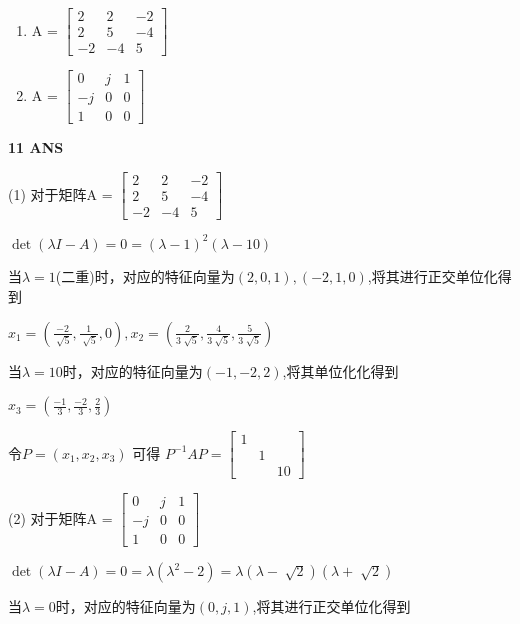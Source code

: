 \documentclass[11pt,letterpaper]{ctexart}
\begin{document}
\begin{enumerate}
\begin{enumerate}
	\item A = $\begin{bmatrix}
		2 & 2 & -2 \\
		2 & 5 & -4 \\
		-2 & -4 & 5  
		\end{bmatrix}$
	
	\item A = $\begin{bmatrix}
		0 & j & 1 \\
	-j & 0 & 0 \\
	1 & 0 & 0
	\end{bmatrix}$

\end{enumerate}




\textbf{11 ANS}
\bigskip

(1) 对于矩阵A = $\begin{bmatrix}
2 & 2 & -2 \\
2 & 5 & -4 \\
-2 & -4 & 5  
\end{bmatrix}$

$\det(\lambda I - A) = 0 = (\lambda - 1)^2(\lambda -10)$

当$\lambda = 1$(二重)时，对应的特征向量为$(2, 0, 1),(-2, 1, 0)$,将其进行正交单位化得到

$x_1 = (\frac{-2}{\sqrt[]{5}}, \frac{1}{\sqrt[]{5}}, 0),x_2 = (\frac{2}{3\sqrt[]{5}}, \frac{4}{3\sqrt[]{5}}, \frac{5}{3\sqrt[]{5}})$

当$\lambda = 10$时，对应的特征向量为$(-1,-2,2)$,将其单位化化得到

$x_3 = (\frac{-1}{3}, \frac{-2}{3}, \frac{2}{3})$

令$P = (x_1, x_2, x_3)$ 可得 $P^{-1}AP = \begin{bmatrix}
	1 & & \\
	& 1 & \\
	& & 10 
\end{bmatrix}$

\bigskip

(2) 对于矩阵A = $\begin{bmatrix}
0 & j & 1 \\
-j & 0 & 0 \\
1 & 0 & 0
\end{bmatrix}$

$\det(\lambda I - A) = 0 = \lambda(\lambda^2 - 2) = \lambda(\lambda - \sqrt[]{2})(\lambda + \sqrt[]{2})$

当$\lambda = 0$时，对应的特征向量为$(0, j, 1)$,将其进行正交单位化得到


\end{enumerate}
\end{document}
